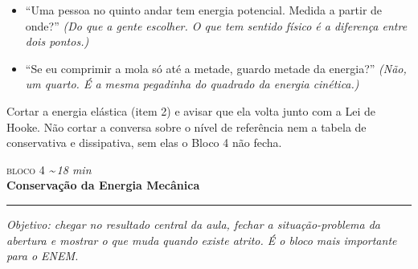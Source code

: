 \documentclass[11pt,a4paper]{article}
\newcommand{\bloco}[3]{%
  \needspace{7\baselineskip}
  \vspace{1.8em}
  {\scshape\color{vinho}bloco #1}\hfill
    {\small\itshape\color{grafite}\textasciitilde\,#3 min}\\[0.1em]
  {\Large\bfseries #2}\\[-0.55em]
  {\color{black!30}\rule{\linewidth}{0.5pt}}
  \par\nobreak\smallskip
}
\newcommand{\objetivo}[1]{{\itshape\color{grafite}Objetivo: #1}\par\smallskip}
\begin{document}
\begin{perguntas}
\begin{itemize}[nosep]
  \item ``Uma pessoa no quinto andar tem energia potencial. Medida a
        partir de onde?''
        \textit{(Do que a gente escolher. O que tem sentido f\'isico \'e
        a diferen\c{c}a entre dois pontos.)}
  \item ``Se eu comprimir a mola s\'o at\'e a metade, guardo metade da
        energia?''
        \textit{(N\~ao, um quarto. \'E a mesma pegadinha do quadrado da
        energia cin\'etica.)}
\end{itemize}
\end{perguntas}

\begin{corte}
Cortar a energia el\'astica (item 2) e avisar que ela volta junto com a
Lei de Hooke. N\~ao cortar a conversa sobre o n\'ivel de refer\^encia
nem a tabela de conservativa e dissipativa, sem elas o Bloco 4 n\~ao
fecha.
\end{corte}

\bloco{4}{Conserva\c{c}\~ao da Energia Mec\^anica}{18}

\objetivo{chegar no resultado central da aula, fechar a
situa\c{c}\~ao-problema da abertura e mostrar o que muda quando existe
atrito. \'E o bloco mais importante para o ENEM.}
\end{document}
